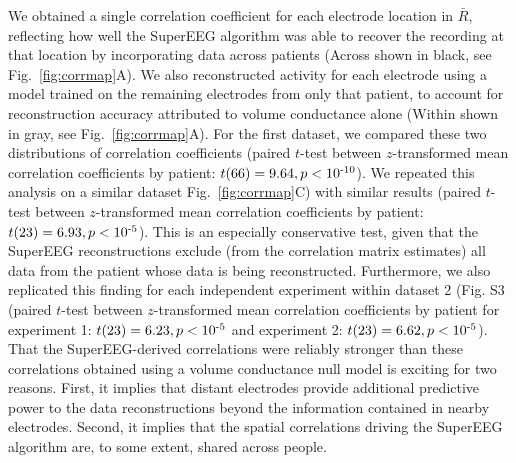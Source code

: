 \documentclass[11pt]{article}
\begin{document}
We obtained a single correlation coefficient for each electrode
location in $\bar{R}$, reflecting how well the SuperEEG algorithm was
able to recover the recording at that location by incorporating data across patients (Across shown in black, see Fig.~\ref{fig:corrmap}A). We also reconstructed activity for each electrode using a model trained on the remaining electrodes from only that patient, to account for reconstruction accuracy attributed to volume conductance alone (Within shown in gray, see Fig.~\ref{fig:corrmap}A). For the first dataset, we compared these two distributions of correlation coefficients (paired $t$-test
between $z$-transformed mean correlation coefficients by patient:
$t(66) = 9.64, p < 10\textsuperscript{-10}$).  We repeated this analysis on a similar dataset Fig.~\ref{fig:corrmap}C) with similar results (paired $t$-test
between $z$-transformed mean correlation coefficients by patient: $t(23) = 6.93, p < 10\textsuperscript{-5}$). This is an especially conservative
test, given that the SuperEEG reconstructions exclude (from the
correlation matrix estimates) all data from the patient whose data is
being reconstructed.  Furthermore, we also replicated this finding for each independent experiment within dataset 2 (Fig. S3 (paired $t$-test
between $z$-transformed mean correlation coefficients by patient for experiment 1: $t(23) = 6.23, p < 10\textsuperscript{-5}$ and experiment 2: $t(23) = 6.62, p < 10\textsuperscript{-5}$).  That the SuperEEG-derived correlations were reliably
stronger than these correlations obtained using a volume conductance null model is exciting
for two reasons.  First, it implies that distant electrodes provide
additional predictive power to the data reconstructions beyond the
information contained in nearby electrodes.  Second, it implies that
the spatial correlations driving the SuperEEG algorithm are, to some
extent, shared across people.
\end{document}
